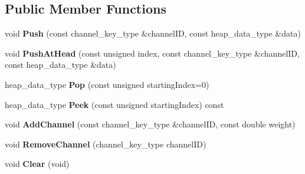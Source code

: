 \subsection*{Public Member Functions}
\begin{DoxyCompactItemize}
\item 
\hypertarget{class_data_structures_1_1_ordered_channel_heap_ad8cc882acdd1045a805418b893fb65f2}{void {\bfseries Push} (const channel\-\_\-key\-\_\-type \&channel\-I\-D, const heap\-\_\-data\-\_\-type \&data)}\label{class_data_structures_1_1_ordered_channel_heap_ad8cc882acdd1045a805418b893fb65f2}

\item 
\hypertarget{class_data_structures_1_1_ordered_channel_heap_a789c8a7b948ef02ca1513c830c16a358}{void {\bfseries Push\-At\-Head} (const unsigned index, const channel\-\_\-key\-\_\-type \&channel\-I\-D, const heap\-\_\-data\-\_\-type \&data)}\label{class_data_structures_1_1_ordered_channel_heap_a789c8a7b948ef02ca1513c830c16a358}

\item 
\hypertarget{class_data_structures_1_1_ordered_channel_heap_a61633143d38c47fedf2b5522f815437e}{heap\-\_\-data\-\_\-type {\bfseries Pop} (const unsigned starting\-Index=0)}\label{class_data_structures_1_1_ordered_channel_heap_a61633143d38c47fedf2b5522f815437e}

\item 
\hypertarget{class_data_structures_1_1_ordered_channel_heap_abfba44a3f552ddc905e686e97d91dedd}{heap\-\_\-data\-\_\-type {\bfseries Peek} (const unsigned starting\-Index) const }\label{class_data_structures_1_1_ordered_channel_heap_abfba44a3f552ddc905e686e97d91dedd}

\item 
\hypertarget{class_data_structures_1_1_ordered_channel_heap_a77415d10c497a89faaf05022f7c68b48}{void {\bfseries Add\-Channel} (const channel\-\_\-key\-\_\-type \&channel\-I\-D, const double weight)}\label{class_data_structures_1_1_ordered_channel_heap_a77415d10c497a89faaf05022f7c68b48}

\item 
\hypertarget{class_data_structures_1_1_ordered_channel_heap_a6a4af0cc8c59949997588d8efc04c5ee}{void {\bfseries Remove\-Channel} (channel\-\_\-key\-\_\-type channel\-I\-D)}\label{class_data_structures_1_1_ordered_channel_heap_a6a4af0cc8c59949997588d8efc04c5ee}

\item 
\hypertarget{class_data_structures_1_1_ordered_channel_heap_aa027bd584a0d968e999ab4cbaf851304}{void {\bfseries Clear} (void)}\label{class_data_structures_1_1_ordered_channel_heap_aa027bd584a0d968e999ab4cbaf851304}


\end{DoxyCompactItemize}

